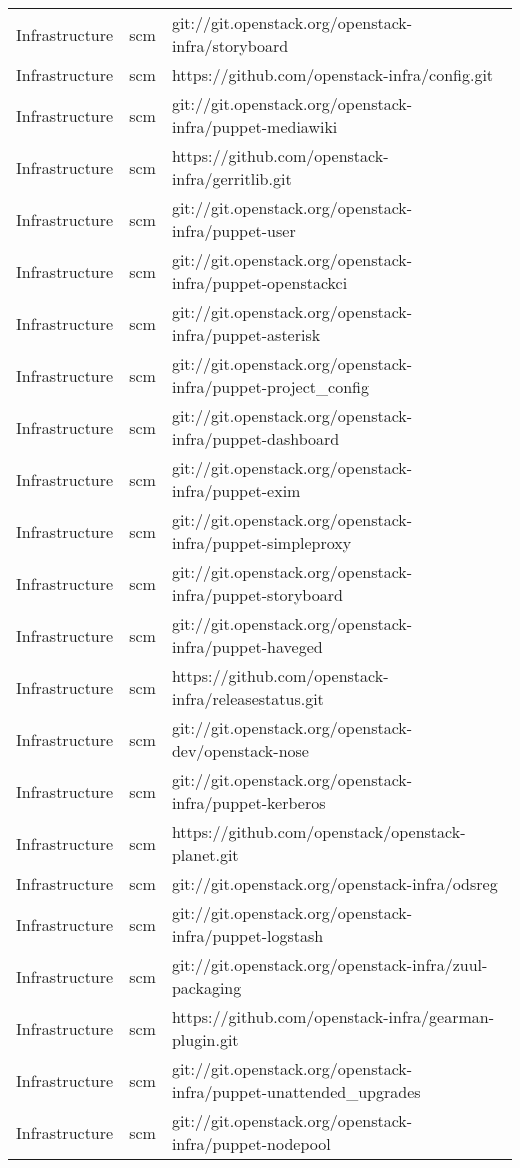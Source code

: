 \begin{center}
\begin{longtable}{|p{4cm}|p{1cm}|p{10cm}|}
Infrastructure&scm&git://git.openstack.org/openstack-infra/storyboard\\ 
Infrastructure&scm&https://github.com/openstack-infra/config.git\\ 
Infrastructure&scm&git://git.openstack.org/openstack-infra/puppet-mediawiki\\ 
Infrastructure&scm&https://github.com/openstack-infra/gerritlib.git\\ 
Infrastructure&scm&git://git.openstack.org/openstack-infra/puppet-user\\ 
Infrastructure&scm&git://git.openstack.org/openstack-infra/puppet-openstackci\\ 
Infrastructure&scm&git://git.openstack.org/openstack-infra/puppet-asterisk\\ 
Infrastructure&scm&git://git.openstack.org/openstack-infra/puppet-project\_config\\ 
Infrastructure&scm&git://git.openstack.org/openstack-infra/puppet-dashboard\\ 
Infrastructure&scm&git://git.openstack.org/openstack-infra/puppet-exim\\ 
Infrastructure&scm&git://git.openstack.org/openstack-infra/puppet-simpleproxy\\ 
Infrastructure&scm&git://git.openstack.org/openstack-infra/puppet-storyboard\\ 
Infrastructure&scm&git://git.openstack.org/openstack-infra/puppet-haveged\\ 
Infrastructure&scm&https://github.com/openstack-infra/releasestatus.git\\ 
Infrastructure&scm&git://git.openstack.org/openstack-dev/openstack-nose\\ 
Infrastructure&scm&git://git.openstack.org/openstack-infra/puppet-kerberos\\ 
Infrastructure&scm&https://github.com/openstack/openstack-planet.git\\ 
Infrastructure&scm&git://git.openstack.org/openstack-infra/odsreg\\ 
Infrastructure&scm&git://git.openstack.org/openstack-infra/puppet-logstash\\ 
Infrastructure&scm&git://git.openstack.org/openstack-infra/zuul-packaging\\ 
Infrastructure&scm&https://github.com/openstack-infra/gearman-plugin.git\\ 
Infrastructure&scm&git://git.openstack.org/openstack-infra/puppet-unattended\_upgrades\\ 
Infrastructure&scm&git://git.openstack.org/openstack-infra/puppet-nodepool\\ 

\end{longtable}
\end{center}
